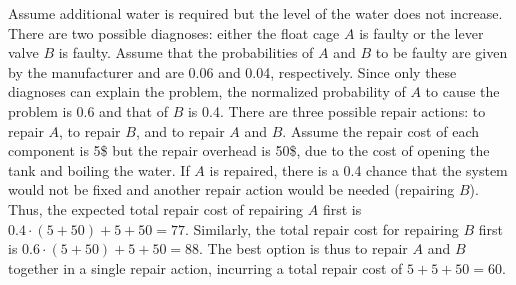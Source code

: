 \documentclass[letterpaper]{article}
\newcommand\meir[1]{\textcolor{red}{meir: #1}}
\begin{document}
Assume additional water is required but the level of the water does not increase. There are two possible diagnoses: either the float cage $A$ is faulty or the lever valve $B$ is faulty. Assume that the probabilities of $A$ and $B$ to be faulty are given by the manufacturer and are 0.06 and 0.04, respectively. Since only these diagnoses can explain the problem, the normalized probability of $A$ to cause the problem is 0.6 and that of $B$ is 0.4. There are three possible repair actions: to repair $A$, to repair $B$, and to repair $A$ and $B$. Assume the repair cost of each component is 5\$ but the repair overhead is 50\$, due to the cost of opening the tank and boiling the water. If $A$ is repaired, there is a 0.4 chance that the system would not be fixed and another repair action would be needed (repairing $B$). Thus, the expected total repair cost of repairing $A$ first is $0.4\cdot(5+50)+5+50=77$. Similarly, the total repair cost for repairing $B$ first is $0.6\cdot(5+50)+5+50=88$. The best option is thus to repair $A$ and $B$ together in a single repair action, incurring a total repair cost of $5+5+50=60$.





\end{document}
